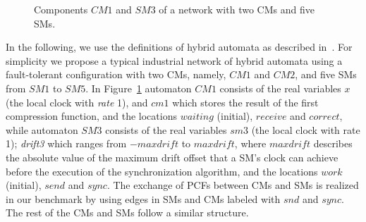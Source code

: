 \begin{figure}[t]

\vspace*{-1em}
\caption{Components $\mathit{CM1}$ and $\mathit{SM3}$ of a network with two CMs and five SMs.}
\label{fig1}
\end{figure}%

In the following, we use the definitions of hybrid automata as described in~\cite{Herrera3}.
For simplicity we propose a typical industrial network of hybrid automata using a fault-tolerant configuration
with two CMs, namely, $\mathit{CM1}$ and $\mathit{CM2}$, 
and five SMs from $\mathit{SM1}$ to $\mathit{SM5}$. 
In Figure~\ref{fig1} automaton $\mathit{CM1}$ consists of the 
real variables $x$ (the local clock with \emph{rate} 1), and $\mathit{cm1}$ which stores the result of the first compression function, and 
the locations $\mathit{waiting}$ (initial), $\mathit{receive}$ and $\mathit{correct}$, while 
automaton $\mathit{SM3}$ consists of the real variables $\mathit{sm3}$ (the local clock with rate 1);  \emph{drift3}  which ranges from 
$-\mathit{maxdrift}$ to $\mathit{maxdrift}$, where $\mathit{maxdrift}$ describes the absolute value of the maximum 
drift offset that a SM's clock can achieve before the execution of the synchronization algorithm, 
and the locations $\mathit{work}$ (initial), $\mathit{send}$ 
and $\mathit{sync}$. The exchange of PCFs between CMs and SMs is realized in our benchmark
by using edges in SMs and CMs labeled with $\mathit{snd}$ and $\mathit{sync}$. 
The rest of the CMs and SMs follow a similar structure.

